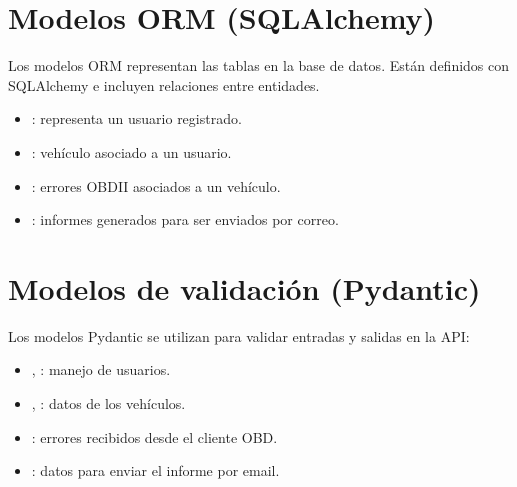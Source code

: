 \documentclass[letterpaper,10pt,spanish]{sphinxmanual}
\begin{document}
\section{Modelos ORM (SQLAlchemy)}
\label{\detokenize{modelos:modelos-orm-sqlalchemy}}
\sphinxAtStartPar
Los modelos ORM representan las tablas en la base de datos. Están definidos con SQLAlchemy e incluyen relaciones entre entidades.
\begin{itemize}
\item {} 
\sphinxAtStartPar
{}: representa un usuario registrado.

\item {} 
\sphinxAtStartPar
{}: vehículo asociado a un usuario.

\item {} 
\sphinxAtStartPar
{}: errores OBD\sphinxhyphen{}II asociados a un vehículo.

\item {} 
\sphinxAtStartPar
{}: informes generados para ser enviados por correo.

\end{itemize}


\section{Modelos de validación (Pydantic)}
\label{\detokenize{modelos:modelos-de-validacion-pydantic}}
\sphinxAtStartPar
Los modelos Pydantic se utilizan para validar entradas y salidas en la API:
\begin{itemize}
\item {} 
\sphinxAtStartPar
{}, : manejo de usuarios.

\item {} 
\sphinxAtStartPar
{}, : datos de los vehículos.

\item {} 
\sphinxAtStartPar
{}: errores recibidos desde el cliente OBD.

\item {} 
\sphinxAtStartPar
{}: datos para enviar el informe por email.

\end{itemize}
\label{\detokenize{modelos:module-main}}
\end{document}

